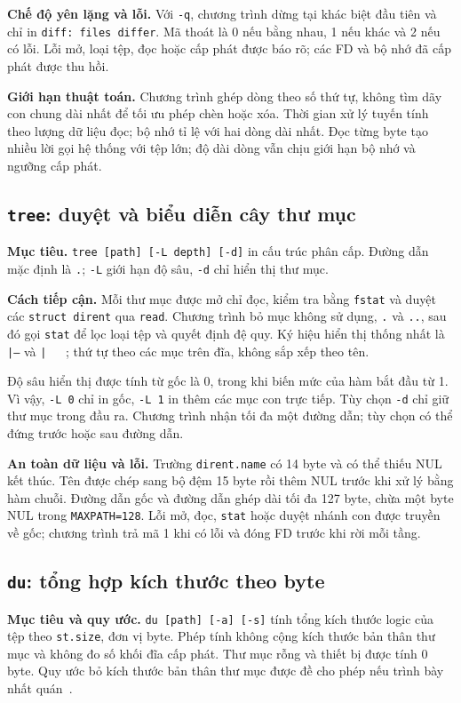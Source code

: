 \documentclass[12pt,a4paper]{article}
\newcommand{\code}[1]{\texttt{#1}}
\begin{document}
\textbf{Chế độ yên lặng và lỗi.} Với \code{-q}, chương trình dừng tại khác biệt đầu tiên và chỉ in \code{diff: files differ}. Mã thoát là 0 nếu bằng nhau, 1 nếu khác và 2 nếu có lỗi. Lỗi mở, loại tệp, đọc hoặc cấp phát được báo rõ; các FD và bộ nhớ đã cấp phát được thu hồi.

\textbf{Giới hạn thuật toán.} Chương trình ghép dòng theo số thứ tự, không tìm dãy con chung dài nhất để tối ưu phép chèn hoặc xóa. Thời gian xử lý tuyến tính theo lượng dữ liệu đọc; bộ nhớ tỉ lệ với hai dòng dài nhất. Đọc từng byte tạo nhiều lời gọi hệ thống với tệp lớn; độ dài dòng vẫn chịu giới hạn bộ nhớ và ngưỡng cấp phát.

\clearpage
\subsection{\texttt{tree}: duyệt và biểu diễn cây thư mục}
\textbf{Mục tiêu.} \code{tree [path] [-L depth] [-d]} in cấu trúc phân cấp. Đường dẫn mặc định là \code{.}; \code{-L} giới hạn độ sâu, \code{-d} chỉ hiển thị thư mục.

\textbf{Cách tiếp cận.} Mỗi thư mục được mở chỉ đọc, kiểm tra bằng \code{fstat} và duyệt các \code{struct dirent} qua \code{read}. Chương trình bỏ mục không sử dụng, \code{.} và \code{..}, sau đó gọi \code{stat} để lọc loại tệp và quyết định đệ quy. Ký hiệu hiển thị thống nhất là \code{|--} và \code{|\ \ \ }; thứ tự theo các mục trên đĩa, không sắp xếp theo tên.

Độ sâu hiển thị được tính từ gốc là 0, trong khi biến mức của hàm bắt đầu từ 1. Vì vậy, \code{-L 0} chỉ in gốc, \code{-L 1} in thêm các mục con trực tiếp. Tùy chọn \code{-d} chỉ giữ thư mục trong đầu ra. Chương trình nhận tối đa một đường dẫn; tùy chọn có thể đứng trước hoặc sau đường dẫn.

\textbf{An toàn dữ liệu và lỗi.} Trường \code{dirent.name} có 14 byte và có thể thiếu NUL kết thúc. Tên được chép sang bộ đệm 15 byte rồi thêm NUL trước khi xử lý bằng hàm chuỗi. Đường dẫn gốc và đường dẫn ghép dài tối đa 127 byte, chừa một byte NUL trong \code{MAXPATH=128}. Lỗi mở, đọc, \code{stat} hoặc duyệt nhánh con được truyền về gốc; chương trình trả mã 1 khi có lỗi và đóng FD trước khi rời mỗi tầng.

\subsection{\texttt{du}: tổng hợp kích thước theo byte}
\textbf{Mục tiêu và quy ước.} \code{du [path] [-a] [-s]} tính tổng kích thước logic của tệp theo \code{st.size}, đơn vị byte. Phép tính không cộng kích thước bản thân thư mục và không đo số khối đĩa cấp phát. Thư mục rỗng và thiết bị được tính 0 byte. Quy ước bỏ kích thước bản thân thư mục được đề cho phép nếu trình bày nhất quán~\cite{assignment}.
\end{document}
